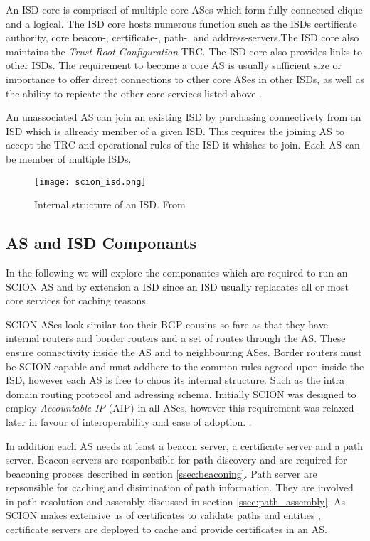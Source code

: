 \documentclass[../eva1_scion.tex]{subfiles}
\begin{document}
    An ISD core is comprised of multiple core ASes which form fully connected clique and a logical. The ISD core hosts numerous function such as the ISDs certificate authority, core beacon-, certificate-, path-, and address-servers.The ISD core also maintains the \textit{Trust Root Configuration} TRC. The ISD core also provides links to other ISDs. The requirement to become a core AS is usually sufficient size or importance to offer direct connections to other core ASes in other ISDs, as well as the ability to repicate the other core services listed above \cite{scion_2011}.

    An unassociated AS can join an existing ISD by purchasing connectivety from an ISD which is allready member of a given ISD. This requires the joining AS to accept the TRC and operational rules of the ISD it whishes to join. Each AS can be member of multiple ISDs.

    \begin{figure}[ht]
        \centering
        \texttt{[image: scion\_isd.png]}
        \caption{Internal structure of an ISD. From \cite{scion_2017}}%
        \label{fig:isd}
    \end{figure}

    \subsection{AS and ISD Componants}

    In the following we will explore the componantes which are required to run an SCION AS and by extension a ISD since an ISD usually replacates all or most core services for caching reasons.

    SCION ASes look similar too their BGP cousins so fare as that they have internal routers and border routers and a set of routes through the AS. These ensure connectivity inside the AS and to neighbouring ASes. Border routers must be SCION capable and must addhere to the common rules agreed upon inside the ISD, however each AS is free to choos its internal structure. Such as the intra domain routing protocol and adressing schema. Initially SCION was designed to employ \textit{Accountable IP} (AIP) \cite{scion_2011} in all ASes, however this requirement was relaxed later in favour of interoperability and ease of adoption. \cite{scion_2017}.

    In addition each AS needs at least a beacon server, a certificate server and a path server. Beacon servers are responbsible for path discovery and are required for beaconing process described in section \ref{ssec:beaconing}. Path server are repsonsible for caching and disimination of path information. They are involved in path resolution and assembly discussed in section \ref{ssec:path_assembly}. As SCION makes extensive us of certificates to validate paths and entities \cite{scion_2011}, certificate servers are deployed to cache and provide certificates in an AS.
    
\end{document}
